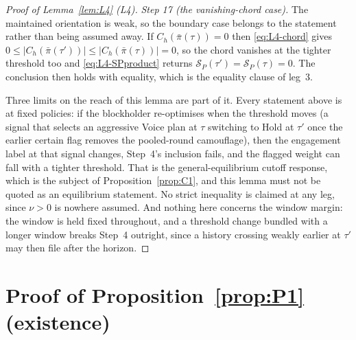 \documentclass[11pt]{article}
\begin{document}
\begin{proof}[Proof of Lemma~\ref{lem:L4} (L4)]
\emph{Step 17 (the vanishing-chord case).} The maintained orientation is weak, so the boundary case
belongs to the statement rather than being assumed away. If $C_h(\bar\pi(\tau)) = 0$ then
\eqref{eq:L4-chord} gives
$0 \le \lvert C_h(\bar\pi(\tau'))\rvert \le \lvert C_h(\bar\pi(\tau))\rvert = 0$, so the chord
vanishes at the tighter threshold too and \eqref{eq:L4-SPproduct} returns
$\mathcal S_P(\tau') = \mathcal S_P(\tau) = 0$. The conclusion then holds with equality, which is the
equality clause of leg~3.

Three limits on the reach of this lemma are part of it. Every statement above is at fixed policies:
if the blockholder re-optimises when the threshold moves (a signal that selects an aggressive
Voice plan at $\tau$ switching to Hold at $\tau'$ once the earlier certain flag removes the
pooled-round camouflage), then the engagement label at that signal changes, Step~4's inclusion
fails, and the flagged weight can fall with a tighter threshold. That is the general-equilibrium
cutoff response, which is the subject of Proposition~\ref{prop:C1}, and this lemma must not be quoted
as an equilibrium statement. No strict inequality is claimed at any leg, since $\nu > 0$ is nowhere
assumed. And nothing here concerns the window margin: the window is held fixed throughout, and a
threshold change bundled with a longer window breaks Step~4 outright, since a history crossing
weakly earlier at $\tau'$ may then file after the horizon.
\end{proof}


\section{Proof of Proposition~\ref{prop:P1} (existence)}
\label{sec:proofs-existence}
\end{document}
